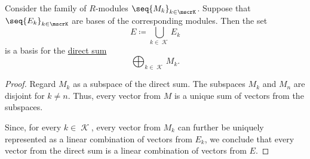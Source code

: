 \begin{proposition}\label{thm:basis_of_direct_sum}
  Consider the family of \( R \)-modules \( \seq{ M_k }_{k \in \mscrK} \). Suppose that \( \seq{ E_k }_{k \in \mscrK} \) are bases of the corresponding modules. Then the set
  \begin{equation*}
    E \coloneqq \bigcup_{k \in \mscrK} E_k
  \end{equation*}
  is a basis for the \hyperref[def:first_order_direct_product]{direct sum}
  \begin{equation*}
    \bigoplus_{k \in \mscrK} M_k.
  \end{equation*}
\end{proposition}
\begin{proof}
  Regard \( M_k \) as a subspace of the direct sum. The subspaces \( M_k \) and \( M_n \) are disjoint for \( k \neq n \). Thus, every vector from \( M \) is a unique sum of vectors from the subspaces.

  Since, for every \( k \in \mscrK \), every vector from \( M_k \) can further be uniquely represented as a linear combination of vectors from \( E_k \), we conclude that every vector from the direct sum is a linear combination of vectors from \( E \).
\end{proof}

